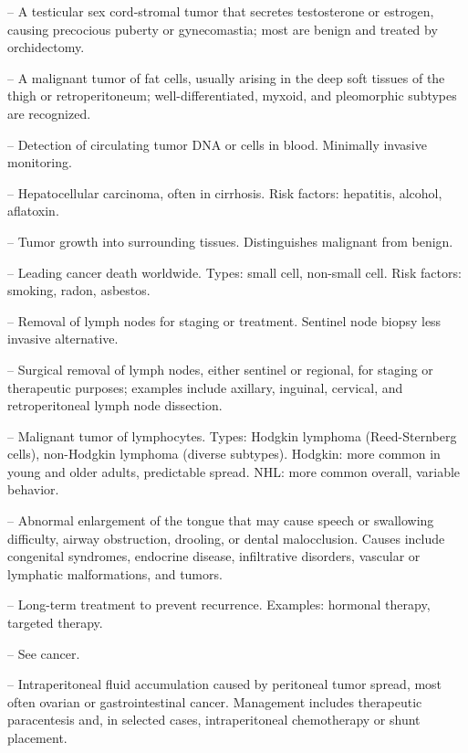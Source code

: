 -- A testicular sex cord-stromal tumor that secretes testosterone or estrogen, causing precocious puberty or gynecomastia; most are benign and treated by orchidectomy.

-- A malignant tumor of fat cells, usually arising in the deep soft tissues of the thigh or retroperitoneum; well-differentiated, myxoid, and pleomorphic subtypes are recognized.

-- Detection of circulating tumor DNA or cells in blood. Minimally invasive monitoring.

-- Hepatocellular carcinoma, often in cirrhosis. Risk factors: hepatitis, alcohol, aflatoxin.

-- Tumor growth into surrounding tissues. Distinguishes malignant from benign.

-- Leading cancer death worldwide. Types: small cell, non-small cell. Risk factors: smoking, radon, asbestos.

-- Removal of lymph nodes for staging or treatment. Sentinel node biopsy less invasive alternative.

-- Surgical removal of lymph nodes, either sentinel or regional, for staging or therapeutic purposes; examples include axillary, inguinal, cervical, and retroperitoneal lymph node dissection.

-- Malignant tumor of lymphocytes. Types: Hodgkin lymphoma (Reed-Sternberg cells), non-Hodgkin lymphoma (diverse subtypes). Hodgkin: more common in young and older adults, predictable spread. NHL: more common overall, variable behavior.

-- Abnormal enlargement of the tongue that may cause speech or swallowing difficulty, airway obstruction, drooling, or dental malocclusion. Causes include congenital syndromes, endocrine disease, infiltrative disorders, vascular or lymphatic malformations, and tumors.

-- Long-term treatment to prevent recurrence. Examples: hormonal therapy, targeted therapy.

-- See cancer.

-- Intraperitoneal fluid accumulation caused by peritoneal tumor spread, most often ovarian or gastrointestinal cancer. Management includes therapeutic paracentesis and, in selected cases, intraperitoneal chemotherapy or shunt placement.

